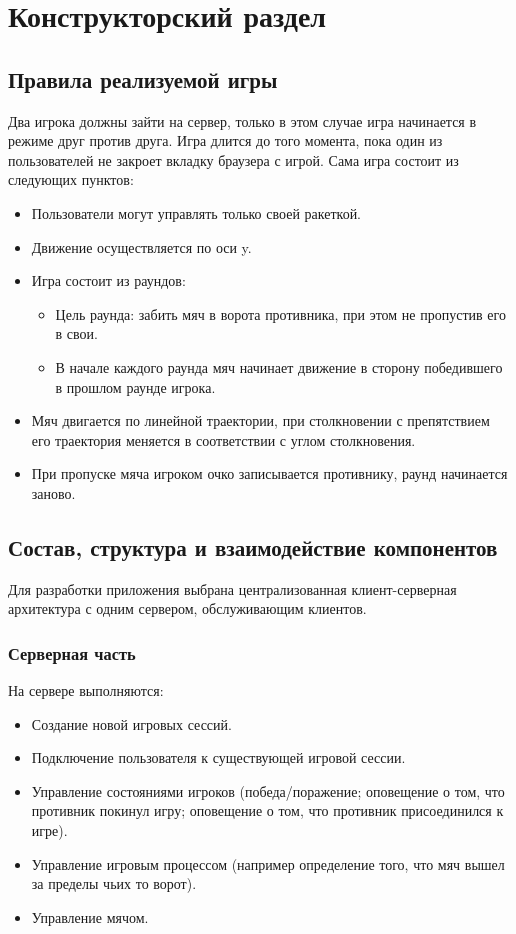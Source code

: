 \chapter{Конструкторский раздел}
\label{cha:design}

\section{Правила реализуемой игры}

Два игрока должны зайти на сервер, только в этом случае игра начинается в режиме друг против друга.
Игра длится до того момента, пока один из пользователей не закроет вкладку браузера с игрой. Сама игра состоит из следующих пунктов:

\begin{itemize}
	\item Пользователи могут управлять только своей ракеткой.
	\item Движение осуществляется по оси y.
	\item Игра состоит из раундов:
	\begin{itemize}
		\item Цель раунда: забить мяч в ворота противника, при этом не пропустив его в свои.
		\item В начале каждого раунда мяч начинает движение в сторону победившего в прошлом раунде игрока.
	\end{itemize}
	\item Мяч двигается по линейной траектории, при столкновении с препятствием его траектория меняется в соответствии с углом столкновения.
	\item При пропуске мяча игроком очко записывается противнику, раунд начинается заново.
\end{itemize}

\section{Состав, структура и взаимодействие компонентов}

Для разработки приложения выбрана централизованная клиент-серверная архитектура с одним сервером, обслуживающим клиентов.

\subsection{Серверная часть}

На сервере выполняются:

\begin{itemize}
	\item Создание новой игровых сессий.
	\item Подключение пользователя к существующей игровой сессии.
	\item Управление состояниями игроков (победа/поражение; оповещение о том, что противник покинул игру; оповещение о том, что противник присоединился к игре).
	\item Управление игровым процессом (например определение того, что мяч вышел за пределы чьих то ворот).
	\item Управление мячом.
\end{itemize}

